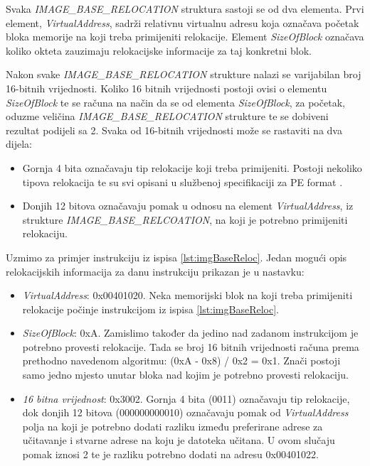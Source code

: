 \documentclass[times, utf8, diplomski, numeric]{fer}
\begin{document}
Svaka \emph{IMAGE\_BASE\_RELOCATION} struktura sastoji se od dva
elementa. Prvi element, \emph{VirtualAddress}, sadrži relativnu
virtualnu adresu koja označava početak bloka memorije na koji
treba primijeniti relokacije. Element \emph{SizeOfBlock} označava
koliko okteta zauzimaju relokacijske informacije za taj konkretni
blok. 

Nakon svake \emph{IMAGE\_BASE\_RELOCATION} strukture nalazi se
varijabilan broj 16-bitnih vrijednosti. Koliko 16 bitnih vrijednosti 
postoji ovisi o elementu \emph{SizeOfBlock} te se računa na način da
se od elementa \emph{SizeOfBlock}, za početak, oduzme veličina \emph{IMAGE\_BASE\_RELOCATION}
strukture te se dobiveni rezultat podijeli sa 2. Svaka od 16-bitnih
vrijednosti može se rastaviti na dva dijela:

\begin{itemize}
\item Gornja 4 bita označavaju tip relokacije koji treba
primijeniti. Postoji nekoliko tipova relokacija te su svi opisani
u službenoj specifikaciji za PE format \citep{pe_spec}.

\item Donjih 12 bitova označavaju pomak u odnosu na element
\emph{VirtualAddress}, iz strukture
\emph{IMAGE\_BASE\_RELCOATION}, na koji je potrebno primijeniti
relokaciju.
\end{itemize}
Uzmimo za primjer instrukciju iz ispisa \ref{lst:imgBaseReloc}. Jedan mogući
opis relokacijskih informacija za danu instrukciju prikazan je u nastavku:
\begin{itemize}
\item \emph{VirtualAddress}: 0x00401020. Neka memorijski blok na koji treba
primijeniti relokacije počinje instrukcijom iz ispisa \ref{lst:imgBaseReloc}.
\item \emph{SizeOfBlock}: 0xA. Zamislimo također da jedino nad zadanom instrukcijom
je potrebno provesti relokacije. Tada se broj 16 bitnih vrijednosti računa prema 
prethodno navedenom algoritmu: (0xA - 0x8) / 0x2 = 0x1. Znači postoji samo jedno mjesto 
unutar bloka nad kojim je potrebno provesti relokaciju.
\item \emph{16 bitna vrijednost}: 0x3002. Gornja 4 bita (0011) označavaju tip relokacije,
dok donjih 12 bitova (000000000010) označavaju pomak od \emph{VirtualAddress} polja na
koji je potrebno dodati razliku između preferirane adrese za učitavanje i stvarne adrese
na koju je datoteka učitana. U ovom slučaju pomak iznosi 2 te je razliku potrebno dodati
na adresu 0x00401022.
\end{itemize}
\end{document}
